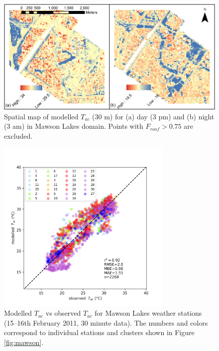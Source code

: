 \documentclass[gmd, manuscript]{copernicus}
\begin{document}
\begin{figure}[!htbp]

\begin{center}

\end{center}

\includegraphics[width=1\textwidth,keepaspectratio]{figure6.png}

 \caption{Spatial map of modelled $T_{ac}$ (30 m) for (a) day (3 pm) and (b) night (3 am) in Mawson Lakes domain. Points with $F_{roof} > 0.75$ are excluded. } \label{fig:MawsonModelledTas}
\end{figure}





\begin{figure}[!htbp]
\begin{center}


\includegraphics[width=0.75\textwidth,keepaspectratio]{figure7.png}

 \caption{Modelled $T_{ac}$ vs observed $T_{ac}$ for Mawson Lakes weather stations (15--16th February 2011, 30 minute data). The  numbers and colors correspond to individual stations and clusters shown in Figure \ref{fig:mawson}. } \label{fig:MawsonModObs}
\end{center}
\end{figure}
\end{document}
